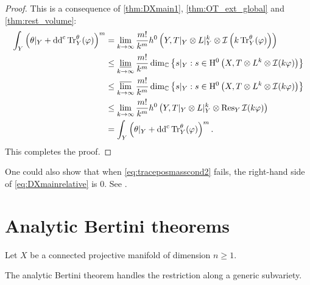 \begin{proof}
This is a consequence of \cref{thm:DXmain1}, \cref{thm:OT_ext_global} and \cref{thm:rest_volume}:
\[
\begin{aligned}
    \int_Y \left(\theta|_Y+\mathrm{dd}^{\mathrm{c}} \operatorname{Tr}_Y^{\theta}(\varphi)\right)^m  & = \lim_{k \to \infty} \frac{m!}{k^m} h^0\left(Y,T|_Y\otimes L|_Y^k\otimes \mathcal{I}\left(k \operatorname{Tr}_Y^{\theta}(\varphi)\right)\right)\\
    & \leq  \varliminf_{k \to \infty} \frac{m!}{k^m} \dim_{\mathbb C}\left\{ s|_Y:  s\in \mathrm{H}^0\left(X,T\otimes L^k \otimes \mathcal{I}(k\varphi)\right)\right\}\\
    & \leq  \varlimsup_{k \to \infty} \frac{m!}{k^m} \dim_{\mathbb C}\left\{ s|_Y:  s\in \mathrm{H}^0\left(X,T\otimes L^k \otimes \mathcal{I}(k\varphi)\right)\right\}\\
  & \leq  \lim_{k \to \infty} \frac{m!}{k^m} h^0\left(Y ,T|_Y\otimes L|_Y^k\otimes \operatorname{Res}_Y\mathcal{I}(k\varphi)\right)\\
  & =  \int_Y \left(\theta|_Y+\mathrm{dd}^{\mathrm{c}} \operatorname{Tr}_Y^{\theta}(\varphi)\right)^m.
  \end{aligned}
\]
This completes the proof.
\end{proof}

\begin{remark}
    One could also show that when \eqref{eq:traceposmasscond2} fails, the right-hand side of \eqref{eq:DXmainrelative} is $0$. See \cite{DX24}.
\end{remark}


\section{Analytic Bertini theorems}\label{sec:ABT}
Let $X$ be a connected projective manifold of dimension $n\geq 1$.

The analytic Bertini theorem handles the restriction along a generic subvariety.


